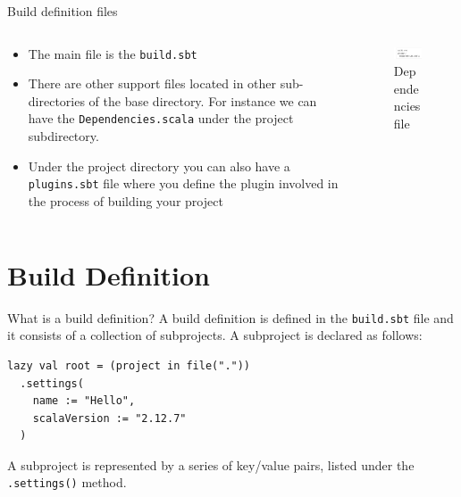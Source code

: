\documentclass[presentation, aspectratio=169]{beamer}
\begin{document}
\begin{frame}[label={sec:org19edb89},fragile]{Build definition files}
 \begin{columns}
\begin{column}{0.45\columnwidth}
\begin{itemize}
\item The main file is the \texttt{build.sbt}
\item There are other support files located in other sub-directories of the base directory.
For instance we can have the \texttt{Dependencies.scala} under the project subdirectory.
\item Under the project directory you can also have a \texttt{plugins.sbt} file where you define the 
plugin involved in the process of building your project
\end{itemize}
\end{column}
\begin{column}{0.5\columnwidth}
\begin{figure}[htbp]
\centering
\includegraphics[width=.9\linewidth]{./img/dep-file.png}
\caption{\label{fig:org6d288fd}Dependencies file}
\end{figure}
\end{column}
\end{columns}
\end{frame}


\section{Build Definition}
\label{sec:org55064d1}

\begin{frame}[label={sec:org7bebb42},fragile]{What is a build definition?}
 A build definition is defined in the \texttt{build.sbt} file and it consists of a collection of subprojects.
A subproject is declared as follows:
\tiny
\begin{verbatim}
lazy val root = (project in file("."))
  .settings(
    name := "Hello",
    scalaVersion := "2.12.7"
  )
\end{verbatim}
\large   
   A subproject is represented by a series of key/value pairs, listed under the \texttt{.settings()} method.
\end{frame}
\end{document}
